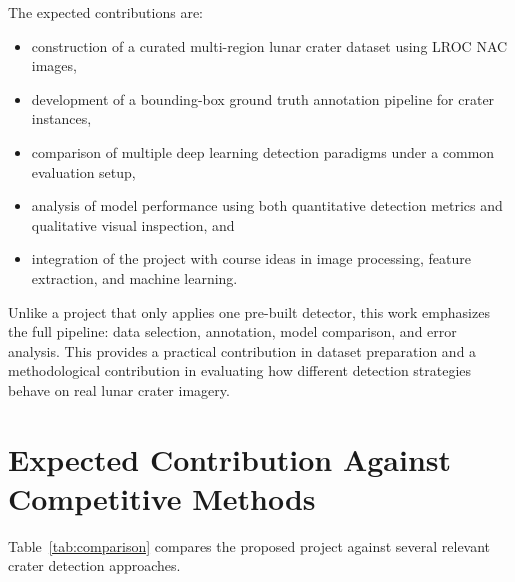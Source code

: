 \documentclass[conference]{IEEEtran}
\begin{document}
	The expected contributions are:
	\begin{itemize}
		\item construction of a curated multi-region lunar crater dataset using LROC NAC images,
		\item development of a bounding-box ground truth annotation pipeline for crater instances,
		\item comparison of multiple deep learning detection paradigms under a common evaluation setup,
		\item analysis of model performance using both quantitative detection metrics and qualitative visual inspection, and
		\item integration of the project with course ideas in image processing, feature extraction, and machine learning.
	\end{itemize}
	
	Unlike a project that only applies one pre-built detector, this work emphasizes the full pipeline: data selection, annotation, model comparison, and error analysis. This provides a practical contribution in dataset preparation and a methodological contribution in evaluating how different detection strategies behave on real lunar crater imagery.
	
	\section{Expected Contribution Against Competitive Methods}
	Table~\ref{tab:comparison} compares the proposed project against several relevant crater detection approaches.
	
\end{document}
